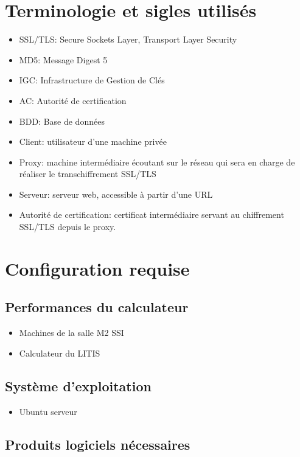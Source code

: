 \documentclass[a4paper,11pt,french]{article}
\begin{document}
\section{Terminologie et sigles utilisés}

\begin{itemize}
\item SSL/TLS: Secure Sockets Layer, Transport Layer Security 
\item MD5: Message Digest 5
\item IGC: Infrastructure de Gestion de Clés
\item AC: Autorité de certification
\item BDD: Base de données
\item Client: utilisateur d'une machine privée
\item Proxy: machine intermédiaire écoutant sur le réseau qui sera en charge de réaliser le transchiffrement SSL/TLS
\item Serveur: serveur web, accessible à partir d'une URL
\item Autorité de certification: certificat intermédiaire servant au chiffrement SSL/TLS depuis le proxy.
\end{itemize}


\section{Configuration requise}

\subsection{Performances du calculateur}

\begin{itemize}
\item Machines de la salle M2 SSI
\item Calculateur du LITIS
\end{itemize}

\subsection{Système d'exploitation}

\begin{itemize}
\item Ubuntu serveur
\end{itemize}

\subsection{Produits logiciels nécessaires}
\end{document}
